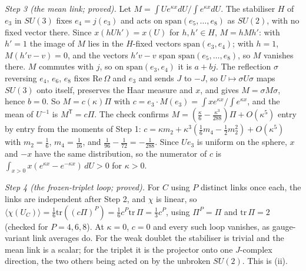 \emph{Step 3 (the mean link; proved).} Let $M = \int Ue^{\kappa x}dU/\int e^{\kappa x}dU$. The stabiliser $H$ of $e_{3}$ in $SU(3)$ fixes $e_{4} = j(e_{3})$ and acts on $\mathrm{span}(e_{5}, \dots, e_{8})$ as $SU(2)$, with no fixed vector there. Since $x(hUh') = x(U)$ for $h, h' \in H$, $M = hMh'$: with $h' = 1$ the image of $M$ lies in the $H$-fixed vectors $\mathrm{span}(e_{3}, e_{4})$; with $h = 1$, $M(h'v - v) = 0$, and the vectors $h'v - v$ span $\mathrm{span}(e_{5}, \dots, e_{8})$, so $M$ vanishes there. $M$ commutes with $j$, so on $\mathrm{span}(e_{3}, e_{4})$ it is $a + bj$. The reflection $\sigma$ reversing $e_{4}$, $e_{6}$, $e_{8}$ fixes $\mathrm{Re}\,\Omega$ and $e_{3}$ and sends $J$ to $-J$, so $U \mapsto \sigma U\sigma$ maps $SU(3)$ onto itself, preserves the Haar measure and $x$, and gives $M = \sigma M\sigma$, hence $b = 0$. So $M = c(\kappa)\Pi$ with $c = e_{3}\cdot M(e_{3}) = \int xe^{\kappa x}/\int e^{\kappa x}$, and the mean of $U^{-1}$ is $M^{\mathsf T} = c\Pi$. The check confirms $M = (\tfrac{\kappa}{6} - \tfrac{\kappa^{3}}{288})\Pi + O(\kappa^{5})$ entry by entry from the moments of Step 1: $c = \kappa m_{2} + \kappa^{3}(\tfrac16m_{4} - \tfrac12m_{2}^{2}) + O(\kappa^{5})$ with $m_{2} = \tfrac16$, $m_{4} = \tfrac1{16}$, and $\tfrac1{96} - \tfrac1{72} = -\tfrac1{288}$. Since $Ue_{3}$ is uniform on the sphere, $x$ and $-x$ have the same distribution, so the numerator of $c$ is $\int_{x > 0}x(e^{\kappa x} - e^{-\kappa x})\,dU > 0$ for $\kappa > 0$.

\emph{Step 4 (the frozen-triplet loop; proved).} For $C$ using $P$ distinct links once each, the links are independent after Step 2, and $\chi$ is linear, so $\langle\chi(U_{C})\rangle = \tfrac16\mathrm{tr}((c\Pi)^{P}) = \tfrac16c^{P}\mathrm{tr}\,\Pi = \tfrac13c^{P}$, using $\Pi^{P} = \Pi$ and $\mathrm{tr}\,\Pi = 2$ (checked for $P = 4, 6, 8$). At $\kappa = 0$, $c = 0$ and every such loop vanishes, as gauge-variant link averages do. For the weak doublet the stabiliser is trivial and the mean link is a scalar; for the triplet it is the projector onto one $J$-complex direction, the two others being acted on by the unbroken $SU(2)$. This is (ii).

